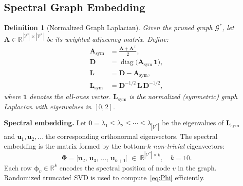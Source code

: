 \documentclass[journal]{IEEEtran}
\newtheorem{definition}{Definition}
\begin{document}
\subsection{Spectral Graph Embedding}
\label{subsec:spectral}

\begin{definition}[Normalized Graph Laplacian]
\label{def:laplacian}
Given the pruned graph $\mathcal{G}^{*}$, let
$\mathbf{A}\in\mathbb{R}^{|\mathcal{V}^{*}|\times|\mathcal{V}^{*}|}$ be its
weighted adjacency matrix.  Define:
\begin{align}
  \mathbf{A}_{\mathrm{sym}}
    &= \frac{\mathbf{A} + \mathbf{A}^{\!\top}}{2},
    \label{eq:Asym} \\[4pt]
  \mathbf{D}
    &= \operatorname{diag}\!\bigl(\mathbf{A}_{\mathrm{sym}}\,\mathbf{1}\bigr),
    \label{eq:degree} \\[4pt]
  \mathbf{L}
    &= \mathbf{D} - \mathbf{A}_{\mathrm{sym}},
    \label{eq:laplacian} \\[4pt]
  \mathbf{L}_{\mathrm{sym}}
    &= \mathbf{D}^{-1/2}\,\mathbf{L}\,\mathbf{D}^{-1/2},
    \label{eq:Lsym}
\end{align}
where $\mathbf{1}$ denotes the all-ones vector.
$\mathbf{L}_{\mathrm{sym}}$ is the \emph{normalized (symmetric)} graph
Laplacian with eigenvalues in $[0,2]$.
\end{definition}

\noindent\textbf{Spectral embedding.}
Let $0 = \lambda_1 \leq \lambda_2 \leq \cdots \leq \lambda_{|\mathcal{V}^{*}|}$
be the eigenvalues of $\mathbf{L}_{\mathrm{sym}}$ and
$\mathbf{u}_1, \mathbf{u}_2, \ldots$ the corresponding orthonormal
eigenvectors.
The spectral embedding is the matrix formed by the bottom-$k$
\emph{non-trivial} eigenvectors:
\begin{equation}
  \boldsymbol{\Phi}
    = \bigl[\mathbf{u}_{2},\,\mathbf{u}_{3},\,\ldots,\,\mathbf{u}_{k+1}\bigr]
    \;\in\; \mathbb{R}^{|\mathcal{V}^{*}|\times k},
  \quad k = 10.
  \label{eq:Phi}
\end{equation}
Each row $\boldsymbol{\phi}_{v}\in\mathbb{R}^{k}$ encodes the spectral
position of node $v$ in the graph.
Randomized truncated SVD is used to compute~\eqref{eq:Phi} efficiently.
\end{document}
